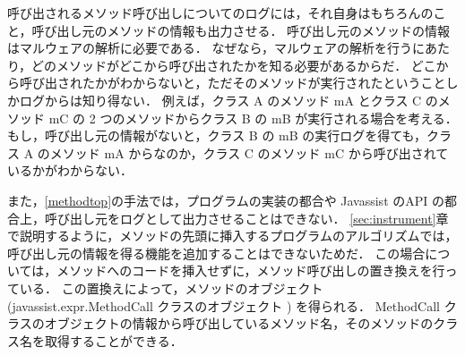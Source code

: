 呼び出されるメソッド呼び出しについてのログには，それ自身はもちろんのこと，呼び出し元のメソッドの情報も出力させる．
呼び出し元のメソッドの情報はマルウェアの解析に必要である．
なぜなら，マルウェアの解析を行うにあたり，どのメソッドがどこから呼び出されたかを知る必要があるからだ．
どこから呼び出されたかがわからないと，ただそのメソッドが実行されたということしかログからは知り得ない．
例えば，クラス A のメソッド mA とクラス C のメソッド mC の 2 つのメソッドからクラス B の mB が実行される場合を考える．
もし，呼び出し元の情報がないと，クラス B の mB の実行ログを得ても，クラス A のメソッド mA からなのか，クラス C のメソッド mC から呼び出されているかがわからない．

また，\ref{methodtop}の手法では，プログラムの実装の都合や Javassist のAPI の都合上，呼び出し元をログとして出力させることはできない．
\ref{sec:instrument}章で説明するように，メソッドの先頭に挿入するプログラムのアルゴリズムでは，呼び出し元の情報を得る機能を追加することはできないためだ．
この場合については，メソッドへのコードを挿入せずに，メソッド呼び出しの置き換えを行っている．
この置換えによって，メソッドのオブジェクト(javassist.expr.MethodCall クラスのオブジェクト ) を得られる．
MethodCall クラスのオブジェクトの情報から呼び出しているメソッド名，そのメソッドのクラス名を取得することができる．

